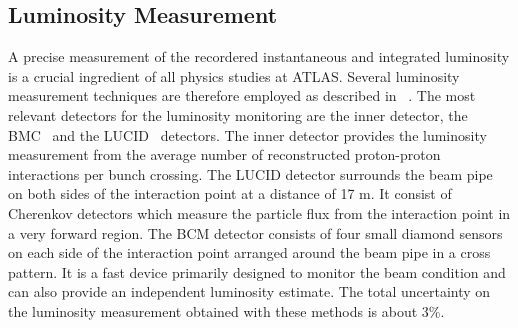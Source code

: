 \subsection{Luminosity Measurement}
A precise measurement of the recordered instantaneous and integrated luminosity is a crucial ingredient of
all  physics studies at ATLAS.
Several luminosity measurement techniques are therefore employed as described in ~\cite{luminosity}.
The most relevant detectors for the luminosity monitoring are the inner detector,
the BMC~\cite{luminosity} and the LUCID~\cite{lucid} detectors. 
The inner detector provides the luminosity measurement from  the average number of reconstructed proton-proton interactions per bunch crossing.
The LUCID detector surrounds the beam pipe on both sides of the interaction point at a distance of 17 m. It consist of
Cherenkov detectors which  measure  the particle flux from the interaction point in a very forward region. The BCM detector 
consists of four small diamond sensors on each side of the interaction point arranged around the beam pipe in a cross pattern.
It is a fast device primarily designed to monitor the beam condition and can also provide an independent luminosity estimate.
The total uncertainty on the luminosity measurement obtained with these methods is about 3\%.










